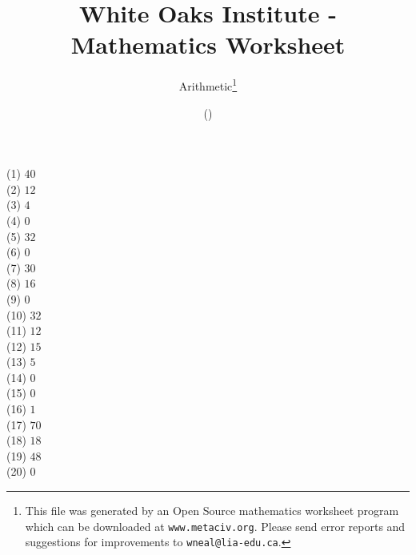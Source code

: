 \documentclass[letter]{article}
\begin{document}
\title{White Oaks Institute - Mathematics Worksheet}
\author{Arithmetic\thanks{This file was generated by an \textsf{Open Source} mathematics worksheet program which can be downloaded at \texttt{www.metaciv.org}. Please send error reports and suggestions for improvements to \texttt{wneal@lia-edu.ca}.}}
\date{\XCfileversion{} (\XCfiledate)}
\maketitle
\setlength{\parskip}{12mm plus 4mm minus 4mm}\setlength{\parindent}{0cm}\begin{multicols}{2}(1) $40$\\(2) $12$\\(3) $4$\\(4) $0$\\(5) $32$\\(6) $0$\\(7) $30$\\(8) $16$\\(9) $0$\\(10) $32$\\(11) $12$\\(12) $15$\\(13) $5$\\(14) $0$\\(15) $0$\\(16) $1$\\(17) $70$\\(18) $18$\\(19) $48$\\(20) $0$\\\end{multicols}
\end{document}
